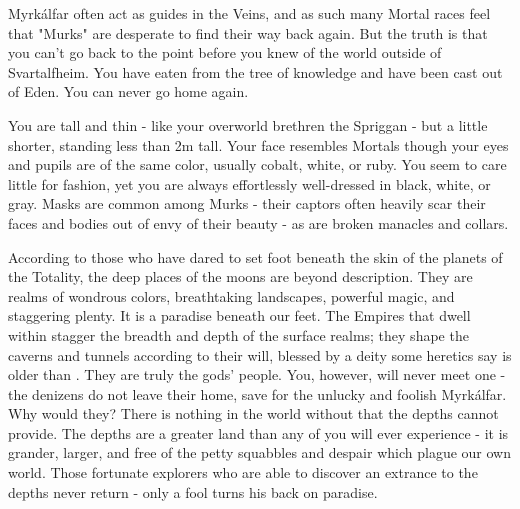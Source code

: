 {  Myrkálfar often act as guides in the Veins, and as such many Mortal races feel that "Murks" are desperate to find their way back again. But the truth is that you can't go back to the point before you knew of the world outside of Svartalfheim.  You have eaten from the tree of knowledge and have been cast out of Eden.  You can never go home again.

  You are tall and thin - like your overworld brethren the Spriggan - but a little shorter, standing less than 2m tall.  Your face resembles Mortals though your eyes and pupils are of the same color,  usually cobalt, white, or ruby.  You seem to care little for fashion, yet you are always effortlessly well-dressed in black, white, or gray.  Masks are common among Murks - their captors often heavily scar their faces and bodies out of envy of their beauty - as are broken manacles and collars.





  According to those who have dared to set foot beneath the skin of the planets of the Totality, the deep places of the moons are beyond description.  They are realms of wondrous colors, breathtaking landscapes, powerful magic, and staggering plenty.  It is a paradise beneath our feet.  The Empires that dwell within stagger the breadth and depth of the surface realms; they shape the caverns and tunnels according to their will, blessed by a deity some heretics say is older than \TheAuthority.  They are truly the gods' people.  You, however, will never meet one - the denizens do not leave their home, save for the unlucky and foolish Myrkálfar.  Why would they?  There is nothing in the world without that the depths cannot provide.  The depths are a greater land than any of you will ever experience - it is grander, larger, and free of the petty squabbles and despair which plague our own world.  Those fortunate explorers who are able to discover an extrance to the depths never return - only a fool turns his back on paradise.\footnotemark


  \setcounter{footnote}{0}  

}
